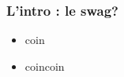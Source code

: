 \speaker{\Kafui}
\begin{frame}
  \frametitle{L'intro : le swag?}
  \begin{itemize}
    \item coin
    \item coincoin
  \end{itemize}
\end{frame}
